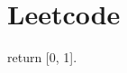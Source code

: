 \documentclass[kindlepaper]{BHCexam4kindle}
\begin{document}
\section{Leetcode}
\clearpage







return [0, 1].
\clearpage
\end{document}
